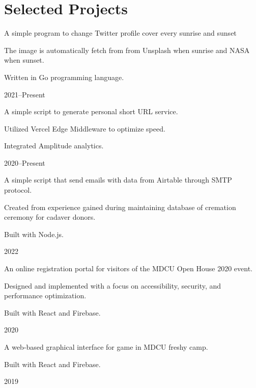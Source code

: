 \documentclass{cv}
\begin{document}
\section{Selected Projects}
\begin{cv_table}
  {\begin{cv_itemize}
      \item A simple program to change Twitter profile cover every sunrise and sunset
      \item The image is automatically fetch from from Unsplash when sunrise and NASA when sunset.
      \item Written in Go programming language.
    \end{cv_itemize}
  }{}{2021--Present}
  {\begin{cv_itemize}
      \item A simple script to generate personal short URL service.
      \item Utilized Vercel Edge Middleware to optimize speed.
      \item Integrated Amplitude analytics.
    \end{cv_itemize}
  }{}{2020--Present}
  {\begin{cv_itemize}
      \item A simple script that send emails with data from Airtable through SMTP protocol.
      \item Created from experience gained during maintaining database of cremation ceremony for cadaver donors.
      \item Built with Node.js.
    \end{cv_itemize}
  }{}{2022}
  {\begin{cv_itemize}
      \item An online registration portal for visitors of the MDCU Open House 2020 event.
      \item Designed and implemented with a focus on accessibility, security, and performance optimization.
      \item Built with React and Firebase.
    \end{cv_itemize}
  }{}{2020}
  {\begin{cv_itemize}
      \item A web-based graphical interface for game in MDCU freshy camp.
      \item Built with React and Firebase.
    \end{cv_itemize}
  }{}{2019}
\end{cv_table}
\end{document}
